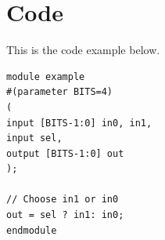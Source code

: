 \documentclass[11pt]{article}
\begin{document}
\section*{Code}

This is the code example below.
\begin{lstlisting}[style=Verilog,
caption=Direct Verilog code example,
label=code:ex 
]
module example
#(parameter BITS=4)
(
input [BITS-1:0] in0, in1,
input sel,
output [BITS-1:0] out
);

// Choose in1 or in0
out = sel ? in1: in0; 
endmodule
\end{lstlisting}
\end{document}

